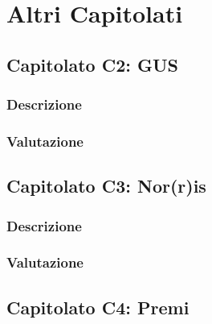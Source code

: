 %

\section{Altri Capitolati}


\subsection{Capitolato C2: GUS}

\subsubsection{Descrizione}

\subsubsection{Valutazione}



\subsection{Capitolato C3: Nor(r)is}

\subsubsection{Descrizione}

\subsubsection{Valutazione}



\subsection{Capitolato C4: Premi}


